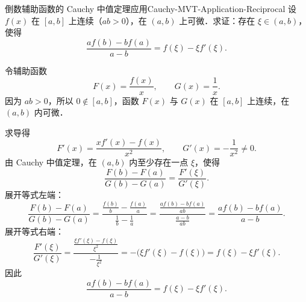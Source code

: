 \begin{problem}{倒数辅助函数的 Cauchy 中值定理应用}{Cauchy-MVT-Application-Reciprocal}
    设 $f(x)$ 在 $[a, b]$ 上连续（$ab > 0$），在 $(a, b)$ 上可微．求证：存在 $\xi \in (a, b)$，使得
    \begin{equation}
        \frac{af(b) - bf(a)}{a - b} = f(\xi) - \xi f'(\xi).
    \end{equation}
\end{problem}

\begin{myproof}
    令辅助函数
    \begin{equation}
        F(x) = \frac{f(x)}{x}, \qquad G(x) = \frac{1}{x}.
    \end{equation}
    因为 $ab > 0$，所以 $0 \notin [a, b]$，函数 $F(x)$ 与 $G(x)$ 在 $[a, b]$ 上连续，在 $(a, b)$ 内可微．

    求导得
    \begin{equation}
        F'(x) = \frac{x f'(x) - f(x)}{x^2}, \qquad G'(x) = -\frac{1}{x^2} \neq 0.
    \end{equation}
    由 Cauchy 中值定理，在 $(a, b)$ 内至少存在一点 $\xi$，使得
    \begin{equation}
        \frac{F(b) - F(a)}{G(b) - G(a)} = \frac{F'(\xi)}{G'(\xi)}.
    \end{equation}
    展开等式左端：
    \begin{equation}
        \frac{F(b) - F(a)}{G(b) - G(a)} = \frac{\frac{f(b)}{b} - \frac{f(a)}{a}}{\frac{1}{b} - \frac{1}{a}} = \frac{\frac{af(b) - bf(a)}{ab}}{\frac{a - b}{ab}} = \frac{af(b) - bf(a)}{a - b}.
    \end{equation}
    展开等式右端：
    \begin{equation}
        \frac{F'(\xi)}{G'(\xi)} = \frac{\frac{\xi f'(\xi) - f(\xi)}{\xi^2}}{-\frac{1}{\xi^2}} = -\bigl( \xi f'(\xi) - f(\xi) \bigr) = f(\xi) - \xi f'(\xi).
    \end{equation}
    因此
    \begin{equation}
        \frac{af(b) - bf(a)}{a - b} = f(\xi) - \xi f'(\xi).
    \end{equation}
\end{myproof}

\endinput
